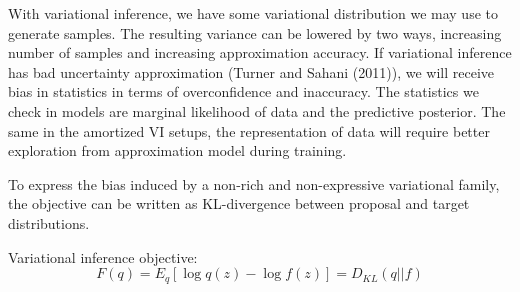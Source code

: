 \documentclass[10pt,letterpaper]{article}
\begin{document}

With variational inference, we have some variational distribution we may use to generate samples. The resulting variance can be lowered by two ways, increasing number of samples and increasing approximation accuracy.
If variational inference has bad uncertainty approximation (Turner and Sahani (2011)), we will receive bias in statistics in terms of overconfidence and inaccuracy. 
The statistics we check in models are marginal likelihood of data and the predictive posterior. 
The same in the amortized VI setups, the representation of data will require better exploration from approximation model during training.

To express the bias induced by a non-rich and non-expressive variational family, the objective can be written as KL-divergence between proposal and target distributions.

Variational inference objective:
\begin{equation*}
    F(q) = E_q[\log q(z) - \log f(z)] = D_{KL}(q||f)
\end{equation*}
\end{document}
